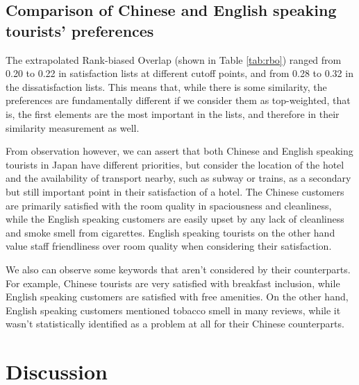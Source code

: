 \documentclass[review]{elsarticle}
\begin{document}
\subsection{Comparison of Chinese and English speaking tourists' preferences}


The extrapolated Rank-biased Overlap (shown in Table \ref{tab:rbo}) ranged from 0.20 to 0.22 in satisfaction lists at different cutoff points, and from 0.28 to 0.32 in the dissatisfaction lists. This means that, while there is some similarity, the preferences are fundamentally different if we consider them as top-weighted, that is, the first elements are the most important in the lists, and therefore in their similarity measurement as well.

From observation however, we can assert that both Chinese and English speaking tourists in Japan have different priorities, but consider the location of the hotel and the availability of transport nearby, such as subway or trains, as a secondary but still important point in their satisfaction of a hotel. The Chinese customers are primarily satisfied with the room quality in spaciousness and cleanliness, while the English speaking customers are easily upset by any lack of cleanliness and smoke smell from cigarettes. English speaking tourists on the other hand value staff friendliness over room quality when considering their satisfaction. 

We also can observe some keywords that aren't considered by their counterparts. For example, Chinese tourists are very satisfied with breakfast inclusion, while English speaking customers are satisfied with free amenities. On the other hand, English speaking customers mentioned tobacco smell in many reviews, while it wasn't statistically identified as a problem at all for their Chinese counterparts. 

\section{Discussion}\label{discussion}

\subsection{}

\end{document}
